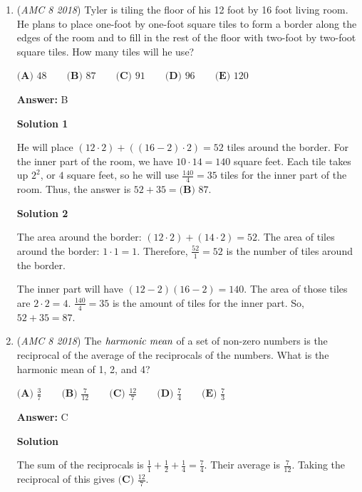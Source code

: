 \begin{enumerate}
 


	\item (\textit{AMC 8 2018}) Tyler is tiling the floor of his 12 foot by 16 foot living room. He plans to place one-foot by one-foot square tiles to form a border along the edges of the room and to fill in the rest of the floor with two-foot by two-foot square tiles. How many tiles will he use?


 $\textbf{(A) }48\qquad\textbf{(B) }87\qquad\textbf{(C) }91\qquad\textbf{(D) }96\qquad \textbf{(E) }120$

 \textbf{Answer: }B



\textbf{Solution 1}

He will place $(12\cdot2)+((16-2)\cdot2)=52$ tiles around the border. For the inner part of the room, we have $10\cdot14=140$ square feet. Each tile takes up $2^{2}$, or $4$ square feet, so he will use $\frac{140}{4}=35$ tiles for the inner part of the room. Thus, the answer is $52+35= \boxed{\textbf{(B) }87}$.

 



\textbf{Solution 2}

The area around the border: $(12 \cdot 2) + (14 \cdot 2) = 52$. The area of tiles around the border: $1 \cdot 1 = 1$. Therefore, $\frac{52}{1} = 52$ is the number of tiles around the border.

 The inner part will have $(12 - 2)(16 - 2) = 140$. The area of those tiles are $2 \cdot 2 = 4$. $\frac{140}{4} = 35$ is the amount of tiles for the inner part. So, $52 + 35 = \boxed{87}$.

 


	\item (\textit{AMC 8 2018}) The $\emph{harmonic mean}$ of a set of non-zero numbers is the reciprocal of the average of the reciprocals of the numbers. What is the harmonic mean of 1, 2, and 4?


 $\textbf{(A) }\frac{3}{7}\qquad\textbf{(B) }\frac{7}{12}\qquad\textbf{(C) }\frac{12}{7}\qquad\textbf{(D) }\frac{7}{4}\qquad \textbf{(E) }\frac{7}{3}$

 \textbf{Answer: }C



\textbf{Solution}

The sum of the reciprocals is $\frac{1}{1} + \frac{1}{2} + \frac{1}{4}= \frac{7}{4}$. Their average is $\frac{7}{12}$. Taking the reciprocal of this gives $\boxed{\textbf{(C) }\frac{12}{7}}$.


\end{enumerate}
